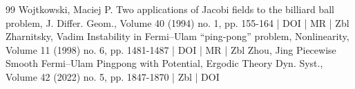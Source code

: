 \begin{thebibliography}{99}
Wojtkowski, Maciej P. Two applications of Jacobi fields to the billiard ball problem, J. Differ. Geom., Volume 40 (1994) no. 1, pp. 155-164 | DOI | MR | Zbl
Zharnitsky, Vadim Instability in Fermi–Ulam “ping-pong” problem, Nonlinearity, Volume 11 (1998) no. 6, pp. 1481-1487 | DOI | MR | Zbl
Zhou, Jing Piecewise Smooth Fermi–Ulam Pingpong with Potential, Ergodic Theory Dyn. Syst., Volume 42 (2022) no. 5, pp. 1847-1870 | Zbl | DOI
\end{thebibliography}
